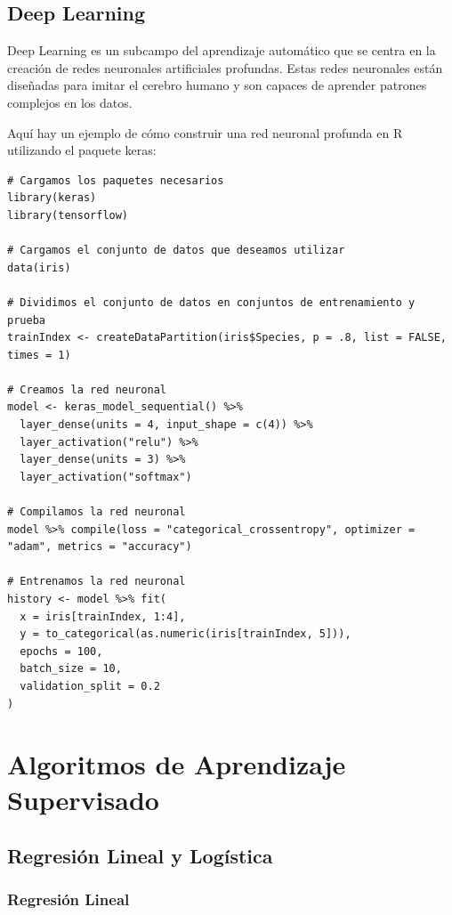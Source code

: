 \documentclass[12pt]{article}
\begin{document}
\subsection{Deep Learning}

Deep Learning es un subcampo del aprendizaje automático que se centra en la creación de redes neuronales artificiales profundas. Estas redes neuronales están diseñadas para imitar el cerebro humano y son capaces de aprender patrones complejos en los datos.

Aquí hay un ejemplo de cómo construir una red neuronal profunda en R utilizando el paquete keras:

\begin{verbatim}
# Cargamos los paquetes necesarios
library(keras)
library(tensorflow)

# Cargamos el conjunto de datos que deseamos utilizar
data(iris)

# Dividimos el conjunto de datos en conjuntos de entrenamiento y prueba
trainIndex <- createDataPartition(iris$Species, p = .8, list = FALSE, times = 1)

# Creamos la red neuronal
model <- keras_model_sequential() %>% 
  layer_dense(units = 4, input_shape = c(4)) %>% 
  layer_activation("relu") %>% 
  layer_dense(units = 3) %>% 
  layer_activation("softmax")

# Compilamos la red neuronal
model %>% compile(loss = "categorical_crossentropy", optimizer = "adam", metrics = "accuracy")

# Entrenamos la red neuronal
history <- model %>% fit(
  x = iris[trainIndex, 1:4],
  y = to_categorical(as.numeric(iris[trainIndex, 5])),
  epochs = 100,
  batch_size = 10,
  validation_split = 0.2
)
\end{verbatim}



\section{Algoritmos de Aprendizaje Supervisado}

\subsection{Regresión Lineal y Logística}
\subsubsection{Regresión Lineal}
\end{document}
